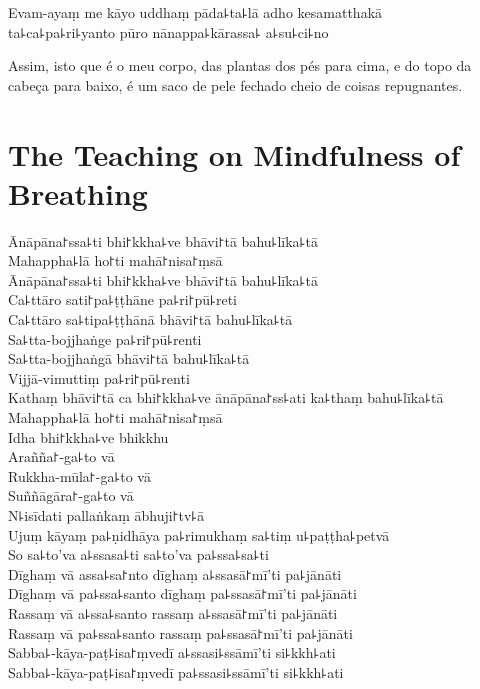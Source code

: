 \documentclass[
  babelLanguage=english,
  final,
  webversion,
]{chantingbook}
\begin{document}
Evam-ayaṃ me kāyo uddhaṃ pāda꜕ta꜕lā adho kesamatthakā\\
ta꜕ca꜕pa꜕ri꜕yanto pūro nānappa꜕kārassa꜕ a꜕su꜕ci꜕no

\begin{english}
  Assim, isto que é o meu corpo, das plantas dos pés para cima, e do topo da cabeça para baixo, é um saco de pele fechado cheio de coisas repugnantes.
\end{english}

\chapter{The Teaching on Mindfulness of Breathing}

\begin{leader}
\end{leader}

Ānāpāna꜓ssa꜕ti bhi꜓kkha꜕ve bhāvi꜓tā bahu꜕līka꜕tā\\
Mahappha꜕lā ho꜓ti mahā꜓nisa꜓ṃsā\\
Ānāpāna꜓ssa꜕ti bhi꜓kkha꜕ve bhāvi꜓tā bahu꜕līka꜕tā\\
Ca꜕ttāro sati꜓pa꜕ṭṭhāne pa꜕ri꜓pū꜕reti\\
Ca꜕ttāro sa꜕tipa꜕ṭṭhānā bhāvi꜓tā bahu꜕līka꜕tā\\
Sa꜕tta-bojjhaṅge pa꜕ri꜓pū꜕renti\\
Sa꜕tta-bojjhaṅgā bhāvi꜓tā bahu꜕līka꜕tā\\
Vijjā-vimuttiṃ pa꜕ri꜓pū꜕renti\\
Kathaṃ bhāvi꜓tā ca bhi꜓kkha꜕ve ānāpāna꜓ss꜕ati ka꜕thaṃ bahu꜕līka꜕tā\\
Mahappha꜕lā ho꜓ti mahā꜓nisa꜓ṃsā\\
Idha bhi꜓kkha꜕ve bhikkhu\\
Arañña꜓-ga꜕to vā\\
Rukkha-mūla꜓-ga꜕to vā\\
Suññāgāra꜓-ga꜕to vā\\
N꜕isīdati pallaṅkaṃ ābhuji꜓tv꜕ā\\
Ujuṃ kāyaṃ pa꜕ṇidhāya pa꜕rimukhaṃ sa꜕tiṃ u꜕paṭṭha꜕petvā\\
So sa꜕to'va a꜕ssasa꜕ti sa꜕to'va pa꜕ssa꜕sa꜕ti\\
Dīghaṃ vā assa꜕sa꜓nto dīghaṃ a꜕ssasā꜓mī'ti pa꜕jānāti\\
Dīghaṃ vā pa꜕ssa꜕santo dīghaṃ pa꜕ssasā꜓mī'ti pa꜕jānāti\\
Rassaṃ vā a꜕ssa꜕santo rassaṃ a꜕ssasā꜓mī'ti pa꜕jānāti\\
Rassaṃ vā pa꜕ssa꜕santo rassaṃ pa꜕ssasā꜓mī'ti pa꜕jānāti\\
Sabba꜕-kāya-paṭ꜕isa꜓ṃvedī a꜕ssasi꜕ssāmī'ti si꜕kkh꜕ati\\
Sabba꜕-kāya-paṭ꜕isa꜓ṃvedī pa꜕ssasi꜕ssāmī'ti si꜕kkh꜕ati
\end{document}
